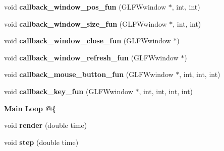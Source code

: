 \begin{DoxyCompactItemize}
\item 
\hypertarget{classNeb_1_1window_1_1window_a3ed32063aa32171defec3ed03f164a02}{void {\bfseries callback\-\_\-window\-\_\-pos\-\_\-fun} (\-G\-L\-F\-Wwindow $\ast$, int, int)}\label{classNeb_1_1window_1_1window_a3ed32063aa32171defec3ed03f164a02}

\item 
\hypertarget{classNeb_1_1window_1_1window_a6f527f0e0cd09194ac0ef05a8098d2d2}{void {\bfseries callback\-\_\-window\-\_\-size\-\_\-fun} (\-G\-L\-F\-Wwindow $\ast$, int, int)}\label{classNeb_1_1window_1_1window_a6f527f0e0cd09194ac0ef05a8098d2d2}

\item 
\hypertarget{classNeb_1_1window_1_1window_ab339d32c95b892e7f49bf58cf886f729}{void {\bfseries callback\-\_\-window\-\_\-close\-\_\-fun} (\-G\-L\-F\-Wwindow $\ast$)}\label{classNeb_1_1window_1_1window_ab339d32c95b892e7f49bf58cf886f729}

\item 
\hypertarget{classNeb_1_1window_1_1window_a76b64020a62de15a8e03dda90a504c5f}{void {\bfseries callback\-\_\-window\-\_\-refresh\-\_\-fun} (\-G\-L\-F\-Wwindow $\ast$)}\label{classNeb_1_1window_1_1window_a76b64020a62de15a8e03dda90a504c5f}

\item 
\hypertarget{classNeb_1_1window_1_1window_a847a29a05cddc0dcd777be672fbe1f32}{void {\bfseries callback\-\_\-mouse\-\_\-button\-\_\-fun} (\-G\-L\-F\-Wwindow $\ast$, int, int, int)}\label{classNeb_1_1window_1_1window_a847a29a05cddc0dcd777be672fbe1f32}

\item 
\hypertarget{classNeb_1_1window_1_1window_aa8caa7bb1cad055efd648a1355a5c06c}{void {\bfseries callback\-\_\-key\-\_\-fun} (\-G\-L\-F\-Wwindow $\ast$, int, int, int, int)}\label{classNeb_1_1window_1_1window_aa8caa7bb1cad055efd648a1355a5c06c}

\end{DoxyCompactItemize}
\begin{Indent}{\bf \-Main \-Loop @\{}\par
\begin{DoxyCompactItemize}
\item 
\hypertarget{classNeb_1_1window_1_1window_ac978d5b2d2cc52518e2aca32394da8e1}{void {\bfseries render} (double time)}\label{classNeb_1_1window_1_1window_ac978d5b2d2cc52518e2aca32394da8e1}

\item 
\hypertarget{classNeb_1_1window_1_1window_a04666e14f95f151785b2038d15a9eacc}{void {\bfseries step} (double time)}\label{classNeb_1_1window_1_1window_a04666e14f95f151785b2038d15a9eacc}

\end{DoxyCompactItemize}
\end{Indent}
